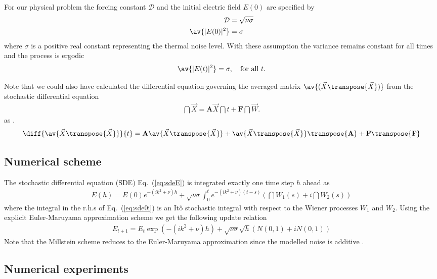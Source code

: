 \documentclass[10pt,a4paper]{article}
\newcommand{\eq}[1]{Eq.~(\ref{#1})}
\newcommand{\src}{\ensuremath{\mathcal{D}}}
\newcommand{\SDE}{\renewcommand{\SDE}{SDE\xspace}stochastic differential equation
(SDE)\xspace}
\begin{document}
For our physical problem the forcing constant $\src$ and the initial electric
field $E(0)$ are specified by
\begin{align}
\src&=\sqrt{\nu\sigma}\\
\av{|E(0)|^2}&=\sigma
\end{align}
where $\sigma$ is a positive real constant representing the thermal noise level. With these
assumption the variance remains constant for all times and the process is
ergodic
\begin{align}
\av{|E(t)|^2} = \sigma, \quad \mbox{for all } t.
\end{align}

Note that we could also have calculated the differential equation governing
the averaged matrix $\av{(\vec{X}\transpose{\vec{X}})}$ from the stochastic
differential equation 
\begin{align}
\dint{\vec{X}}=\mathbf{A}\vec{X}\dint{t}+\mathbf{F}\dint{\vec{W}}.
\end{align}
as \citep{farrell:1996}. 
\begin{align}
\diff{\av{\vec{X}\transpose{\vec{X}}}}{t} = 
\mathbf{A}\av{\vec{X}\transpose{\vec{X}}}+
\av{\vec{X}\transpose{\vec{X}}}\transpose{\mathbf{A}}+
\mathbf{F}\transpose{\mathbf{F}}
\end{align}

\subsection{Numerical scheme}

The \SDE \eq{eq:sdeE} is integrated exactly one time step $h$ ahead as
\begin{align}
E(h) = E(0)e^{-(ik^2+\nu)h}+\sqrt{\nu\sigma}\int_0^t e^{-(ik^2+\nu)(t-s)}
\left(\dint{W_1(s)}+i\dint{W_2(s)}\right)\label{eq:sde0i}
\end{align}
where the integral in the r.h.s of \eq{eq:sde0i} is an It\^o stochastic
integral with respect to the Wiener processes $W_1$ and $W_2$. Using the
explicit Euler-Maruyama approximation scheme \citep{higham:2001} we get
the following update relation
\begin{align}
E_{t+1} = E_t\exp(-(ik^2+\nu)h)+\sqrt{\nu\sigma}\sqrt{h}\left(N(0,1)+iN(0,1)\right)
\label{eq:sde0num}
\end{align}
Note that the Millstein scheme reduces to the Euler-Maruyama approximation
since the modelled noise is additive \citep{higham:2001}.

\subsection{Numerical experiments}
\end{document}
